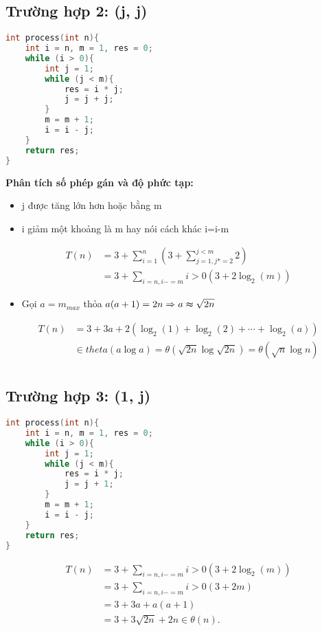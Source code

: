 \documentclass[12pt,a4paper]{article}
\begin{document}
\subsection*{Trường hợp 2: (j, j)}
\begin{lstlisting}[language=C++]
int process(int n){
    int i = n, m = 1, res = 0;
    while (i > 0){
        int j = 1;
        while (j < m){
            res = i * j;
            j = j + j;
        }
        m = m + 1;
        i = i - j;
    }
    return res;
}
\end{lstlisting}

\textbf{Phân tích số phép gán và độ phức tạp:}
\begin{itemize}
    \item j được tăng lớn hơn hoặc bằng m
    \item i giảm một khoảng là m hay nói cách khác i=i-m
\end{itemize}
\begin{align*}
    T(n)&=3+\sum_{i = 1}^{n}(3+\sum_{j=1,j*=2}^{j<m}2)\\
    &=3+\sum_{i=n,i-=m}{i>0}(3+2\log_{2}(m))
\end{align*}
\begin{itemize}
    \item Gọi $a= m_{max}$ thỏa $a(a+1)=2n \Rightarrow a \thickapprox \sqrt{2n}$
\end{itemize}
\begin{align*}
    T(n)&=3+3a+2(\log_{2}(1)+\log_{2}(2)+\cdots+\log_{2}(a))\\
    &\in theta(a\log a)=\theta(\sqrt{2n}\log\sqrt{2n})=\theta(\sqrt{n}\log n)\\
\end{align*}
\subsection*{Trường hợp 3: (1, j)}
\begin{lstlisting}[language=C++]
int process(int n){
    int i = n, m = 1, res = 0;
    while (i > 0){
        int j = 1;
        while (j < m){
            res = i * j;
            j = j + 1;
        }
        m = m + 1;
        i = i - j;
    }
    return res;
}
\end{lstlisting}

\begin{align*}
    T(n)&=3+\sum_{i=n,i-=m}{i>0}(3+2\log_{2}(m))\\
    &=3+\sum_{i=n,i-=m}{i>0}(3+2m)\\
    &=3+3a+a(a+1)\\
    &=3+3\sqrt{2n}+2n \in \theta(n).
\end{align*}
\end{document}
